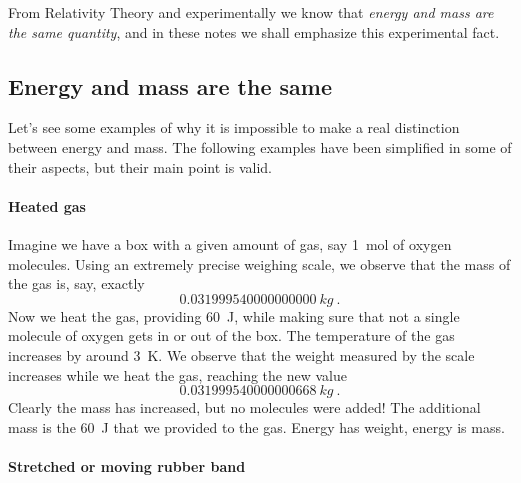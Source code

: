 \documentclass[a4paper,12pt,%
onecolumn,oneside,titlepage,%
british%
]{memoir}
\renewcommand*{\|}[1][]{\nonscript\:#1\vert\nonscript\:\mathopen{}}
\begin{document}
From Relativity Theory and experimentally we know that \emph{energy and mass are the same quantity}, and in these notes we shall emphasize this experimental fact.


\subsection{Energy and mass are the same}
\label{sec:mass_is_energy}

Let's see some examples of why it is impossible to make a real distinction between energy and mass. The following examples have been simplified in some of their aspects, but their main point is valid.

\paragraph{Heated gas}

Imagine we have a box with a given amount of gas, say \qty{1}{mol} of oxygen molecules. Using an extremely precise weighing scale, we observe that the mass of the gas is, say, exactly
\begin{equation*}
  \qty{0.031999540000000000}{kg} \ .
\end{equation*}
Now we heat the gas, providing \qty{60}{J}, while making sure that not a single molecule of oxygen gets in or out of the box. The temperature of the gas increases by around \qty{3}{K}. We observe that the weight measured by the scale increases while we heat the gas, reaching the new value
\begin{equation*}
  \qty{0.031999540000000668}{kg} \ .
\end{equation*}
Clearly the mass has increased, but no molecules were added! The additional mass is the \qty{60}{J} that we provided to the gas. Energy has weight, energy is mass.


\paragraph{Stretched or moving rubber band}
\end{document}
